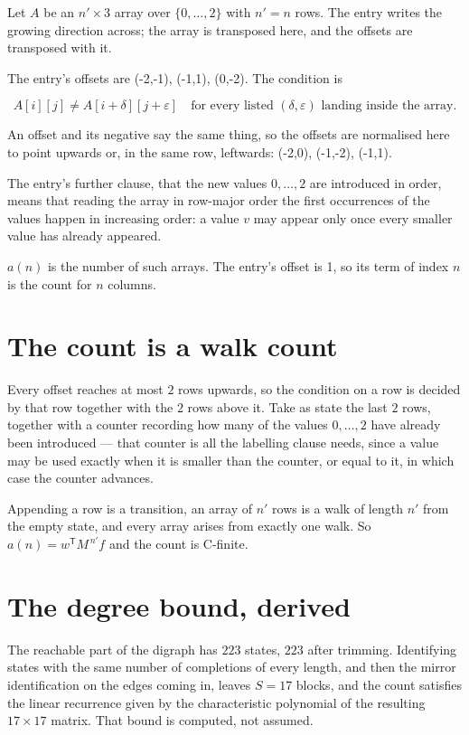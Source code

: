 \documentclass[11pt]{article}
\theoremstyle{definition}
\begin{document}
Let $A$ be an $n' \times 3$ array over $\{0,\dots,2\}$ with $n' = n$ rows. The entry writes the growing direction across; the array is transposed here, and the offsets are transposed with it.

The entry's offsets are (-2,-1), (-1,1), (0,-2). The condition is

\[A[i][j] \ne A[i{+}\delta][j{+}\varepsilon]\quad\text{for every listed }(\delta,\varepsilon)\text{ landing inside the array.}\]

An offset and its negative say the same thing, so the offsets are normalised here to point upwards or, in the same row, leftwards: (-2,0), (-1,-2), (-1,1).

The entry's further clause, that the new values $0,\dots,2$ are introduced in order, means that reading the array in row-major order the first occurrences of the values happen in increasing order: a value $v$ may appear only once every smaller value has already appeared.

$a(n)$ is the number of such arrays. The entry's offset is 1, so its term of index $n$ is the count for $n$ columns.

\section{The count is a walk count}

Every offset reaches at most $2$ rows upwards, so the condition on a row is decided by that row together with the $2$ rows above it. Take as state the last $2$ rows, together with a counter recording how many of the values $0,\dots,2$ have already been introduced --- that counter is all the labelling clause needs, since a value may be used exactly when it is smaller than the counter, or equal to it, in which case the counter advances.

Appending a row is a transition, an array of $n'$ rows is a walk of length $n'$ from the empty state, and every array arises from exactly one walk. So $a(n) = w^{\mathsf T}M^{\,n'}f$ and the count is C-finite.

\section{The degree bound, derived}

The reachable part of the digraph has $223$ states, $223$ after trimming. Identifying states with the same number of completions of every length, and then the mirror identification on the edges coming in, leaves $S = 17$ blocks, and the count satisfies the linear recurrence given by the characteristic polynomial of the resulting $17\times17$ matrix. That bound is computed, not assumed.
\end{document}
